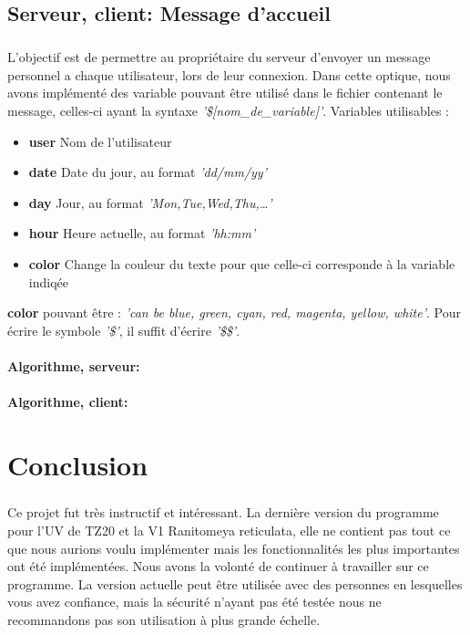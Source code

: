 \documentclass[12pt,a4paper,twoside]{article}
\begin{document}
		\subsection{Serveur, client: Message d'accueil} %
			\subparagraph*{}
				L'objectif est de permettre au propriétaire du serveur d'envoyer un message personnel a chaque utilisateur, lors de leur connexion.
				Dans cette optique, nous avons implémenté des variable pouvant être utilisé dans le fichier contenant le message, celles-ci ayant la syntaxe \textit{'\$[nom\_de\_variable]'}.
				Variables utilisables :
				\begin{itemize}
					\item{} \textbf{user} Nom de l'utilisateur
					\item{} \textbf{date} Date du jour, au format \textit{'dd/mm/yy'}
					\item{} \textbf{day} Jour, au format \textit{'Mon,Tue,Wed,Thu,\ldots'}
					\item{} \textbf{hour} Heure actuelle, au format \textit{'hh:mm'}
					\item{} \textbf{color} Change la couleur du texte pour que celle-ci corresponde à la variable indiqée
				\end{itemize}
				\textbf{color} pouvant être : \textit{'can be blue, green, cyan, red, magenta, yellow, white'}.
				Pour écrire le symbole \textit{'\$'}, il suffit d'écrire \textit{'\$\$'}.
			\paragraph*{Algorithme, serveur:}
				
				
			\paragraph*{Algorithme, client:}
				
				
	\section{Conclusion} %
		\subparagraph*{}
			Ce projet fut très instructif et intéressant. La dernière version du programme pour l'UV de TZ20 et la V1 Ranitomeya reticulata, elle ne contient pas tout ce que nous aurions voulu implémenter mais les fonctionnalités les plus importantes ont été implémentées. Nous avons la volonté de continuer à travailler sur ce programme. La version actuelle peut être utilisée avec des personnes en lesquelles vous avez confiance, mais la sécurité n’ayant pas été testée nous ne recommandons pas son utilisation à plus grande échelle.
\end{document}
